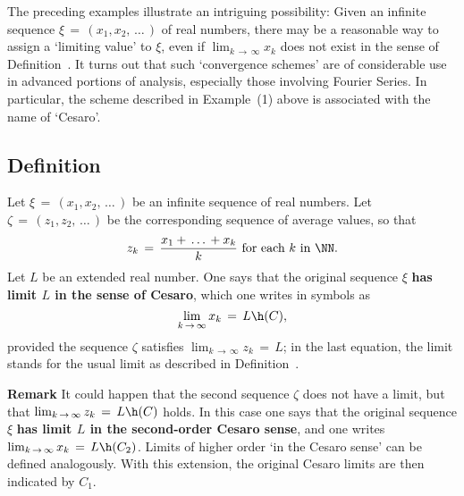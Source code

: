 {\V

        The preceding examples illustrate an intriguing possibility: Given an infinite sequence ${\xi} \,=\, (x_{1},x_{2},\,{\ldots}\,)$ of real numbers, 
    there may be a reasonable way to assign a `limiting value' to ${\xi}$, even if $\lim_{k \,{\rightarrow}\, {\infty}} x_{k}$ does not exist in the sense of
    Definition~.
    It turns out that such `convergence schemes' are of considerable use in advanced portions of analysis, especially those involving Fourier Series.
    In particular, the scheme described in Example~(1) above is associated with the name of `Cesaro'.

\V
\V

            \subsection{\small{\bf Definition}}
            \label{DefC100.40}

        Let ${\xi} \,=\, (x_{1},x_{2},\,{\ldots}\,)$ be an infinite sequence of real numbers.
    Let ${\zeta} \,=\, (z_{1},z_{2},\,{\ldots}\,)$ be the corresponding sequence of average values, so that
        \begin{displaymath}
        z_{k} \,=\, \frac{x_{1} + \,{\ldots}\, + x_{k}}{k} \mbox{ for each $k$ in ${\NN}$}.
        \end{displaymath}
    Let $L$ be an extended real number.
    One says that the original sequence ${\xi}$ {\bf has limit $L$ in the sense of Cesaro}, which one writes in symbols as
        \begin{displaymath}
    \lim_{k \,{\rightarrow}\, {\infty}} x_{k} \,=\, L \h (C),
        \end{displaymath}
    provided the sequence ${\zeta}$ satisfies $\lim_{k \,{\rightarrow}\, {\infty}} z_{k} \,=\, L$;
    in the last equation, the limit stands for the usual limit as described in Definition~.

\V

        {\bf Remark} It could happen that the second sequence ${\zeta}$ does not have a limit, but that $\lim_{k \,{\rightarrow}\, {\infty}} z_{k} \,=\, L \h (C)$ holds.
    In this case one says that the original sequence ${\xi}$ {\bf has limit $L$ in the second-order Cesaro sense},
   and one writes $\lim_{k \,{\rightarrow}\, {\infty}} x_{k} \,=\, L \h (C_{2})$.
    Limits of higher order `in the Cesaro sense' can be defined analogously.
    With this extension, the original Cesaro limits are then indicated by $C_{1}$.

}
